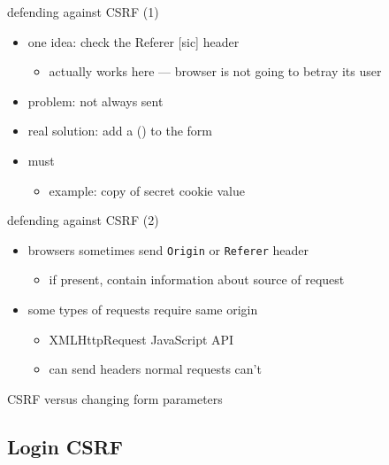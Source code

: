 
\begin{frame}{defending against CSRF (1)}
    \begin{itemize}
        \item one idea: check the Referer [sic] header
            \begin{itemize}
            \item actually works here --- browser is not going to betray its user
            \end{itemize}
        \item problem: not always sent
        \vspace{.5cm}
        \item<2> real solution: add a  () to the form
        \item<2> must 
            \begin{itemize}
            \item example: copy of secret cookie value
            \end{itemize}
    \end{itemize}
\end{frame}

\begin{frame}{defending against CSRF (2)}
    \begin{itemize}
        \item browsers sometimes send \texttt{Origin} or \texttt{Referer} header
            \begin{itemize}
            \item if present, contain information about source of request
            \end{itemize}
        \item some types of requests require same origin
            \begin{itemize}
            \item XMLHttpRequest JavaScript API
            \item can send headers normal requests can't
            \end{itemize}
    \end{itemize}
\end{frame}

\begin{frame}{CSRF versus changing form parameters}
\end{frame}


\subsection{Login CSRF}

